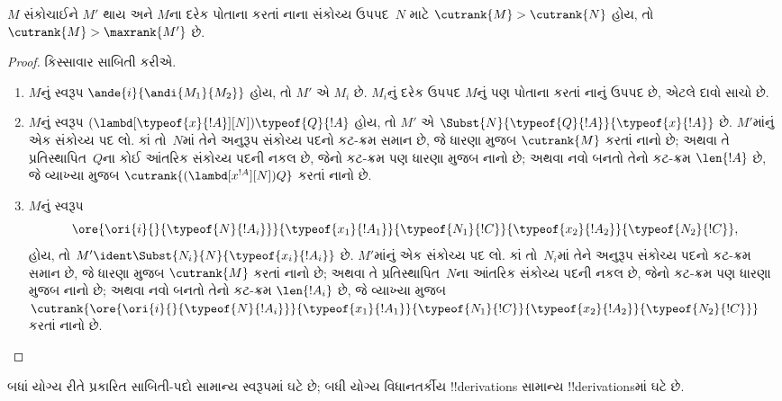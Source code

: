 \documentclass[../../../include/open-logic-section]{subfiles}
\begin{document}
\begin{lem}
  $M$ સંકોચાઈને $M'$ થાય અને $M$ના દરેક પોતાના કરતાં
  નાના સંકોચ્ય ઉપપદ~$N$ માટે $\cutrank{M} > \cutrank{N}$
  હોય, તો $\cutrank{M} > \maxrank{M'}$ છે.
\end{lem}

\begin{proof}
  કિસ્સાવાર સાબિતી કરીએ.
  \begin{enumerate}
  \item $M$નું સ્વરૂપ $\ande{i}{\andi{M_1}{M_2}}$ હોય,
    તો $M'$ એ $M_i$ છે. $M_i$નું દરેક ઉપપદ
    $M$નું પણ પોતાના કરતાં નાનું ઉપપદ છે,
    એટલે દાવો સાચો છે.
  \item $M$નું સ્વરૂપ
    $(\lambd[\typeof{x}{!A}][N])\typeof{Q}{!A}$ હોય, તો
    $M'$ એ $\Subst{N}{\typeof{Q}{!A}}{\typeof{x}{!A}}$ છે.
    $M'$માંનું એક સંકોચ્ય પદ લો. કાં તો~$N$માં
    તેને અનુરૂપ સંકોચ્ય પદનો કટ-ક્રમ સમાન છે,
    જે ધારણા મુજબ $\cutrank{M}$ કરતાં નાનો છે;
    અથવા તે પ્રતિસ્થાપિત~$Q$ના કોઈ આંતરિક સંકોચ્ય
    પદની નકલ છે, જેનો કટ-ક્રમ પણ ધારણા મુજબ નાનો છે;
    અથવા નવો બનતો તેનો કટ-ક્રમ $\len{!A}$ છે, જે વ્યાખ્યા મુજબ
    $\cutrank{(\lambd[x^{!A}][N])Q}$ કરતાં નાનો છે.
  \item $M$નું સ્વરૂપ
    \[
    \ore{\ori{i}{}{\typeof{N}{!A_i}}}
        {\typeof{x_1}{!A_1}}{\typeof{N_1}{!C}}
        {\typeof{x_2}{!A_2}}{\typeof{N_2}{!C}},
    \]
    હોય, તો $M' \ident \Subst{N_i}{N}{\typeof{x_i}{!A_i}}$ છે.
    $M'$માંનું એક સંકોચ્ય પદ લો. કાં તો~$N_i$માં
    તેને અનુરૂપ સંકોચ્ય પદનો કટ-ક્રમ સમાન છે,
    જે ધારણા મુજબ $\cutrank{M}$ કરતાં નાનો છે;
    અથવા તે પ્રતિસ્થાપિત~$N$ના આંતરિક સંકોચ્ય
    પદની નકલ છે, જેનો કટ-ક્રમ પણ ધારણા મુજબ નાનો છે;
    અથવા નવો બનતો તેનો કટ-ક્રમ $\len{!A_i}$ છે, જે વ્યાખ્યા મુજબ
    $\cutrank{\ore{\ori{i}{}{\typeof{N}{!A_i}}}
      {\typeof{x_1}{!A_1}}{\typeof{N_1}{!C}}
      {\typeof{x_2}{!A_2}}{\typeof{N_2}{!C}}}$ કરતાં નાનો છે.
  \end{enumerate}
  
\end{proof}

\begin{thm}
  બધાં યોગ્ય રીતે પ્રકારિત સાબિતી-પદો સામાન્ય સ્વરૂપમાં ઘટે છે;
  બધી યોગ્ય વિધાનતર્કીય !!{derivation}s સામાન્ય
  !!{derivation}sમાં ઘટે છે.
\end{thm}
\end{document}
